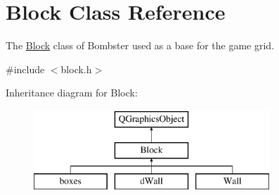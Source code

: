 \hypertarget{class_block}{\section{Block Class Reference}
\label{class_block}
}


The \hyperlink{class_block}{Block} class of Bombster used as a base for the game grid.  




{\ttfamily \#include $<$block.\-h$>$}

Inheritance diagram for Block\-:\begin{figure}[H]
\begin{center}
\leavevmode
\includegraphics[height=3.000000cm]{class_block}
\end{center}
\end{figure}
